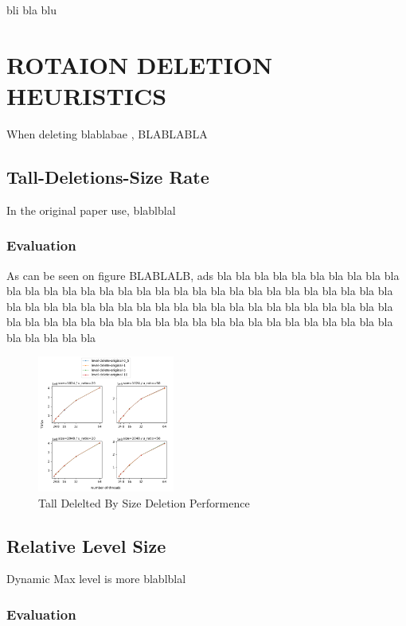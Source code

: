 \documentclass{article}
\begin{document}
bli bla blu

\section{ROTAION DELETION HEURISTICS}
\label{sec:rdh}

When deleting blablabae , BLABLABLA

\subsection{Tall-Deletions-Size Rate}
\label{ssec:tds}

In the original paper use, blablblal

\subsubsection{Evaluation}
\label{sssec:tds-evl}

As can be seen on figure BLABLALB, ads
bla bla bla bla bla bla
bla bla bla bla bla 
bla bla bla bla bla bla
bla bla bla bla bla 
bla bla bla bla bla bla
bla bla bla bla bla 
bla bla bla bla bla bla
bla bla bla bla bla bla
bla bla bla bla bla 
bla bla bla bla bla bla
bla bla bla bla bla 
bla bla bla bla bla bla
bla bla bla bla bla 
bla bla bla bla bla bla

\begin{figure}
	\caption{Tall Delelted By Size Deletion Performence}
	\centering
	\includegraphics[width=0.4\textwidth]{level-delete-original_plot}
\end{figure}

\subsection{Relative Level Size}
\label{ssec:rls}

Dynamic Max level is more blablblal

\subsubsection{Evaluation}
\label{sssec:rls-evl}
\end{document}
